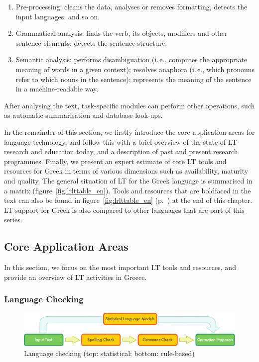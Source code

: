 \begin{multicols}{2}
\begin{enumerate}
\item Pre-processing: cleans the data, analyses or removes formatting, detects the input languages, and so on.
\item Grammatical analysis: finds the verb, its objects, modifiers and other sentence elements; detects the sentence structure.
\item Semantic analysis: performs disambiguation (i.\,e., computes the appropriate meaning of words in a given context); resolves anaphora (i.\,e., which pronouns refer to which nouns in the sentence); represents the meaning of the sentence in a machine-readable way.
\end{enumerate}

After analysing the text, task-specific modules can perform other operations, such as automatic summarisation and database look-ups.

In the remainder of this section, we firstly introduce the core application areas for language technology, and follow this with a brief overview of the state of LT research and education today, and a description of past and present research programmes. Finally, we present an expert estimate of core LT tools and resources for Greek in terms of various dimensions such as availability, maturity and quality. The general situation of LT for the Greek language is summarised in a matrix (figure~\ref{fig:lrlttable_en}). Tools and resources that are boldfaced in the text can also be found in figure~\ref{fig:lrlttable_en} (p.~\pageref{fig:lrlttable_en}) at the end of this chapter. LT support for Greek is also compared to other languages that are part of this series.

\subsection{Core Application Areas}

In this section, we focus on the most important LT tools and resources, and provide an overview of LT activities in Greece.

\subsubsection{Language Checking}

\begin{figure}[t]
  \center
  \includegraphics[width=\textwidth]{../_media/english/language_checking}
  \caption{Language checking (top: statistical; bottom: rule-based)}
\label{fig:langcheckingaarch_en}
\end{figure}


\end{multicols}
